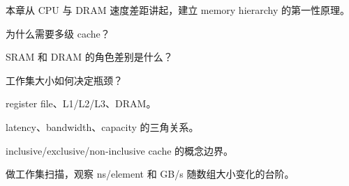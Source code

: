 {本章从 CPU 与 DRAM 速度差距讲起，建立 memory hierarchy 的第一性原理。}
{\item 为什么需要多级 cache？
\item SRAM 和 DRAM 的角色差别是什么？
\item 工作集大小如何决定瓶颈？}
{\item register file、L1/L2/L3、DRAM。
\item latency、bandwidth、capacity 的三角关系。
\item inclusive/exclusive/non-inclusive cache 的概念边界。}
{做工作集扫描，观察 ns/element 和 GB/s 随数组大小变化的台阶。}
